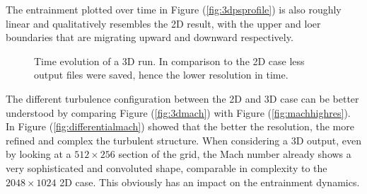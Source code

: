 The entrainment plotted over time in Figure (\ref{fig:3dpsprofile}) is also roughly linear and qualitatively resembles the 2D result, with the upper and loer boundaries that are migrating upward and downward respectively.
\begin{figure}[t!]
      \centering
     \centering
	\hfill
	\caption{Time evolution of a 3D run. In comparison to the 2D case less output files were saved, hence the lower resolution in time.}
	\label{3dsingle}
\end{figure}
The different turbulence configuration between the 2D and 3D case can be better understood by comparing Figure (\ref{fig:3dmach}) with Figure (\ref{fig:machhighres}). In Figure (\ref{fig:differentialmach}) showed that the better the resolution, the more refined and complex the turbulent structure. When considering a 3D output, even by looking at a $512 \times 256$ section of the grid, the Mach number already shows a very sophisticated and convoluted shape, comparable in complexity to the $2048 \times 1024$ 2D case. This obviously has an impact on the entrainment dynamics.

